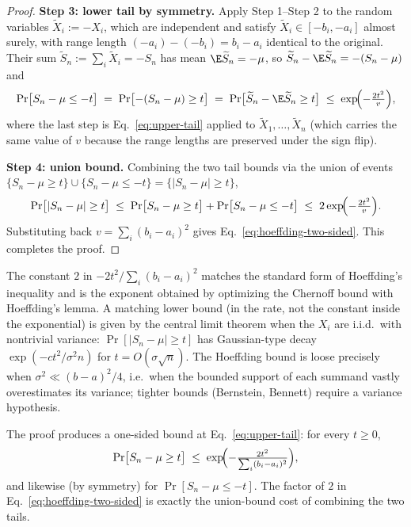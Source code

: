 \begin{proof}
\smallskip\noindent\textbf{Step 3: lower tail by symmetry.}
Apply Step 1--Step 2 to the random variables $\widetilde{X}_i := -X_i$, which are
independent and satisfy $\widetilde{X}_i \in [-b_i, -a_i]$ almost surely, with
range length $(-a_i) - (-b_i) = b_i - a_i$ identical to the original. Their sum
$\widetilde{S}_n := \sum_i \widetilde{X}_i = -S_n$ has mean
$\E \widetilde{S}_n = -\mu$, so $\widetilde{S}_n - \E \widetilde{S}_n = -(S_n - \mu)$
and
\begin{align*}
\Pr\bigl[S_n - \mu \le -t\bigr]
\;=\; \Pr\bigl[-(S_n - \mu) \ge t\bigr]
\;=\; \Pr\bigl[\widetilde{S}_n - \E \widetilde{S}_n \ge t\bigr]
\;\le\; \exp\!\Bigl(-\tfrac{2 t^2}{v}\Bigr),
\end{align*}
where the last step is Eq.~\eqref{eq:upper-tail} applied to $\widetilde{X}_1, \ldots,
\widetilde{X}_n$ (which carries the same value of $v$ because the range lengths are
preserved under the sign flip).

\smallskip\noindent\textbf{Step 4: union bound.}
Combining the two tail bounds via the union of events
$\{S_n - \mu \ge t\} \cup \{S_n - \mu \le -t\} = \{\lvert S_n - \mu \rvert \ge t\}$,
\begin{align*}
\Pr\bigl[\lvert S_n - \mu \rvert \ge t\bigr]
\;\le\; \Pr\bigl[S_n - \mu \ge t\bigr] + \Pr\bigl[S_n - \mu \le -t\bigr]
\;\le\; 2 \exp\!\Bigl(-\tfrac{2 t^2}{v}\Bigr).
\end{align*}
Substituting back $v = \sum_i (b_i - a_i)^2$ gives Eq.~\eqref{eq:hoeffding-two-sided}.
This completes the proof.
\end{proof}

\begin{remark}\label{rem:tightness}
The constant $2$ in $-2 t^2 / \sum_i (b_i - a_i)^2$ matches the standard form of
Hoeffding's inequality and is the exponent obtained by optimizing the Chernoff
bound with Hoeffding's lemma. A matching lower bound (in the rate, not the
constant inside the exponential) is given by the central limit theorem when the
$X_i$ are i.i.d.\ with nontrivial variance: $\Pr[\lvert S_n - \mu \rvert \ge t]$ has
Gaussian-type decay $\exp(-c t^2 / \sigma^2 n)$ for $t = O(\sigma \sqrt{n})$. The
Hoeffding bound is loose precisely when $\sigma^2 \ll (b - a)^2 / 4$, i.e.\ when
the bounded support of each summand vastly overestimates its variance; tighter
bounds (Bernstein, Bennett) require a variance hypothesis.
\end{remark}

\begin{remark}\label{rem:one-sided}
The proof produces a one-sided bound at Eq.~\eqref{eq:upper-tail}: for every $t \ge 0$,
\begin{align*}
\Pr\bigl[S_n - \mu \ge t\bigr] \;\le\; \exp\!\Bigl(-\tfrac{2 t^2}{\sum_i (b_i - a_i)^2}\Bigr),
\end{align*}
and likewise (by symmetry) for $\Pr[S_n - \mu \le -t]$. The factor of $2$ in
Eq.~\eqref{eq:hoeffding-two-sided} is exactly the union-bound cost of combining the
two tails.
\end{remark}
